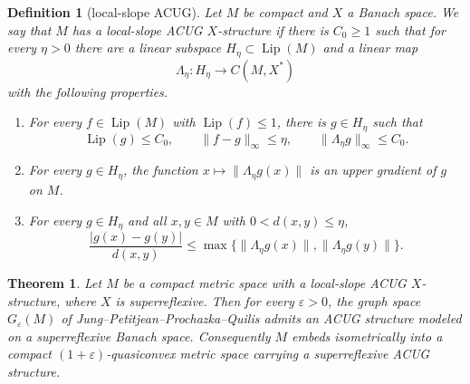 \documentclass[11pt]{article}
\newtheorem{theorem}{Theorem}
\newtheorem{definition}{Definition}
\newcommand{\Lip}{\operatorname{Lip}}
\newcommand{\eps}{\varepsilon}
\begin{document}
\begin{definition}[local-slope ACUG]
Let \(M\) be compact and \(X\) a Banach space.  We say that \(M\) has a
local-slope ACUG \(X\)-structure if there is \(C_0\geq 1\) such that for every
\(\eta>0\) there are a linear subspace \(H_\eta\subset \Lip(M)\) and a linear
map
\[
   \Lambda_\eta:H_\eta\longrightarrow C(M,X^*)
\]
with the following properties.
\begin{enumerate}[label=(\roman*)]
\item For every \(f\in \Lip(M)\) with \(\Lip(f)\leq 1\), there is
      \(g\in H_\eta\) such that
      \[
        \Lip(g)\le C_0,\qquad \|f-g\|_\infty\le \eta,\qquad
        \|\Lambda_\eta g\|_\infty\le C_0 .
      \]
\item For every \(g\in H_\eta\), the function
      \(x\mapsto \|\Lambda_\eta g(x)\|\) is an upper gradient of \(g\) on
      \(M\).
\item For every \(g\in H_\eta\) and all \(x,y\in M\) with
      \(0<d(x,y)\le \eta\),
      \[
        \frac{|g(x)-g(y)|}{d(x,y)}
        \le
        \max\{\|\Lambda_\eta g(x)\|,\|\Lambda_\eta g(y)\|\}.
      \]
\end{enumerate}
\end{definition}

\begin{theorem}
Let \(M\) be a compact metric space with a local-slope ACUG \(X\)-structure,
where \(X\) is superreflexive.  Then for every \(\eps>0\), the graph space
\(G_\eps(M)\) of Jung--Petitjean--Prochazka--Quilis admits an ACUG structure
modeled on a superreflexive Banach space.  Consequently \(M\) embeds
isometrically into a compact \((1+\eps)\)-quasiconvex metric space carrying a
superreflexive ACUG structure.
\end{theorem}
\end{document}
